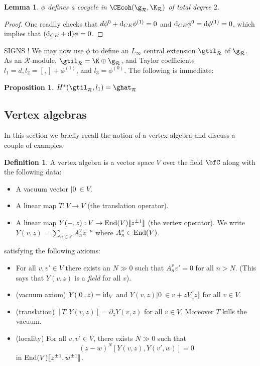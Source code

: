 \documentclass[12pt]{amsart}
\newtheorem{prop}[theorem]{Proposition}
\newtheorem{lemma}[theorem]{Lemma}
\theoremstyle{definition}
\newtheorem{dfn}[theorem]{Definition}
\theoremstyle{remark}
\newcommand{\R}{\mathcal{R}}
\def\d{{\rm d}}
\begin{document}
\begin{lemma}
$\phi$ defines a cocycle in $\CEcoh(\g_{\R}, \K_{\R}) $ of total degree $2$.
\end{lemma}
\begin{proof}
One readily checks that $d \phi^{0} + \d_{CE} \phi^{(1)} = 0 $ and $\d_{CE} \phi^{0} = \d \phi^{(1)} = 0$, which implies that $(\d_{CE} + \d) \phi = 0$.
\end{proof}

{\color{red} SIGNS !}
We may now use $\phi$ to define an $L_{\infty}$ central extension $\gtil_{\R}$ of $\g_{\R}$. As an $\R$-module, $ \gtil_{\R} = \K \oplus \g_{\R} $, and Taylor coefficients $l_1 = d, l_2 = [,] + \phi^{(1)}$, and $l_3 = \phi^{(0)}$. The following is immediate:

\begin{prop}
$H^{*}(\gtil_{\R}, l_1) = \ghat_{\R}$
\end{prop} 

\subsection{Vertex algebras}

In this section we briefly recall the notion of a vertex algebra and discuss a couple of examples. 

\begin{dfn}
A vertex algebra is a vector
space $V$ over the field $\bfC$ along with the following data:
\begin{itemize}
\item A vacuum vector $|0\> \in V$.
\item A linear map $T : V \to V$ (the translation operator).
\item A linear map $Y(-,z) : V \to {\rm End}(V)\llbracket z^{\pm 1}
  \rrbracket$ (the vertex operator). We write $Y(v,z) = \sum_{n \in \mathbb{Z}} A_n^v z^{-n}$
  where $A_n^v \in {\rm End}(V)$. 
\end{itemize} 
satisfying the following axioms:
\begin{itemize}
\item For all $v,v' \in V$ there exists an $N \gg 0$ such that $A_n^v
  v' = 0$ for all $n > N$. (This says that $Y(v,z)$ is a {\it field}
  for all $v$). 
\item (vacuum axiom) $Y(| 0 \>, z) = {\rm id}_V$ and
    $Y(v,z)  |0\> \in v + z V \llbracket z \rrbracket$ for all
    $v \in V$. 
\item (translation) $[T,Y(v,z)] = \partial_z Y(v,z)$ for all $v \in
  V$. Moreover $T$ kills the vacuum. 
\item (locality) For all $v,v' \in V$, there exists $N \gg 0$ such
  that 
\[
(z-w)^N[Y(v,z),Y(v',w)] = 0
\]
in ${\rm End}(V) \llbracket z^{\pm 1},w^{\pm 1}\rrbracket$. 
\end{itemize}
\end{dfn}
\end{document}
